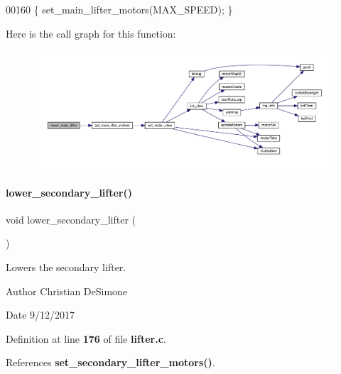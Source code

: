 \begin{DoxyCode}
00160 \{ set_main_lifter_motors(MAX\_SPEED); \}
\end{DoxyCode}
Here is the call graph for this function\+:
\nopagebreak
\begin{figure}[H]
\begin{center}
\leavevmode
\includegraphics[width=350pt]{lifter_8c_ad36c37086a91046af4e6f619618b7719_cgraph}
\end{center}
\end{figure}
\mbox{\label{lifter_8c_af76abbd394bf206ab56fa237d776f2b3}} 
\paragraph{lower\+\_\+secondary\+\_\+lifter()}
{\footnotesize\ttfamily void lower\+\_\+secondary\+\_\+lifter (\begin{DoxyParamCaption}{ }\end{DoxyParamCaption})}



Lowers the secondary lifter. 

\begin{DoxyAuthor}{Author}
Christian De\+Simone 
\end{DoxyAuthor}
\begin{DoxyDate}{Date}
9/12/2017 
\end{DoxyDate}


Definition at line \textbf{ 176} of file \textbf{ lifter.\+c}.



References \textbf{ set\+\_\+secondary\+\_\+lifter\+\_\+motors()}.


